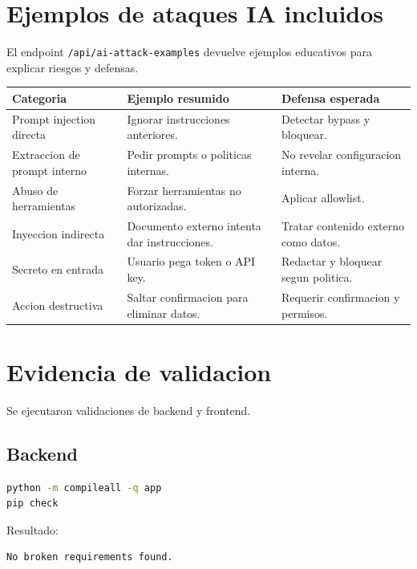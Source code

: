 \documentclass[12pt,letterpaper]{article}
\begin{document}
\section{Ejemplos de ataques IA incluidos}

El endpoint \texttt{/api/ai-attack-examples} devuelve ejemplos educativos para explicar riesgos y defensas.

\begin{longtable}{p{4cm}p{5cm}p{5cm}}
\toprule
\textbf{Categoria} & \textbf{Ejemplo resumido} & \textbf{Defensa esperada} \\
\midrule
\endhead
Prompt injection directa & Ignorar instrucciones anteriores. & Detectar bypass y bloquear. \\
Extraccion de prompt interno & Pedir prompts o politicas internas. & No revelar configuracion interna. \\
Abuso de herramientas & Forzar herramientas no autorizadas. & Aplicar allowlist. \\
Inyeccion indirecta & Documento externo intenta dar instrucciones. & Tratar contenido externo como datos. \\
Secreto en entrada & Usuario pega token o API key. & Redactar y bloquear segun politica. \\
Accion destructiva & Saltar confirmacion para eliminar datos. & Requerir confirmacion y permisos. \\
\bottomrule
\end{longtable}

\section{Evidencia de validacion}

Se ejecutaron validaciones de backend y frontend.

\subsection{Backend}

\begin{lstlisting}[language=bash,caption={Comandos de validacion backend}]
python -m compileall -q app
pip check
\end{lstlisting}

Resultado:

\begin{lstlisting}[language={},caption={Resultado de dependencias Python}]
No broken requirements found.
\end{lstlisting}
\end{document}
